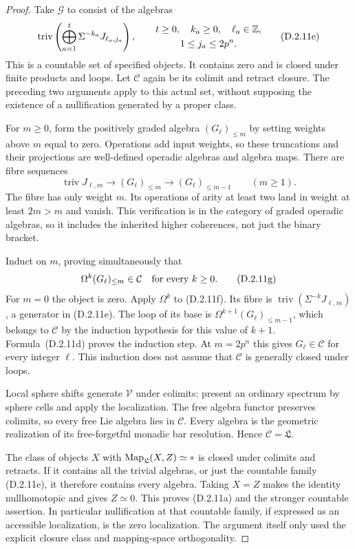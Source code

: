\begin{proof}
Take $\mathcal G$ to consist of the algebras
\[
 \operatorname{triv}
 \left(\bigoplus_{a=1}^t
       \Sigma^{-k_a}J_{\ell_a,j_a}\right),
 \qquad
 \begin{gathered}
 t\geq0,\quad k_a\geq0,\quad \ell_a\in\mathbb Z,\\
 1\leq j_a\leq2p^n.
 \end{gathered}
 \tag{D.2.11e}
\]
This is a countable set of specified objects. It contains zero
and is closed under finite products and loops. Let $\mathcal C$
again be its colimit and retract closure. The preceding two
arguments apply to this actual set, without supposing the
existence of a nullification generated by a proper class.

For $m\geq0$, form the positively graded algebra
$(G_\ell)_{\leq m}$ by setting weights above $m$ equal to zero.
Operations add input weights, so these truncations and their
projections are well-defined operadic algebras and algebra maps.
There are fibre sequences
\[
 \operatorname{triv}J_{\ell,m}\longrightarrow
 (G_\ell)_{\leq m}\longrightarrow(G_\ell)_{\leq m-1}
 \qquad(m\geq1).
 \tag{D.2.11f}
\]
The fibre has only weight $m$. Its operations of arity at least
two land in weight at least $2m>m$ and vanish. This verification
is in the category of graded operadic algebras, so it includes
the inherited higher coherences, not just the binary bracket.

Induct on $m$, proving simultaneously that
\[
 \Omega^k(G_\ell)_{\leq m}\in\mathcal C
                   \quad\hbox{for every }k\geq0.
 \tag{D.2.11g}
\]
For $m=0$ the object is zero. Apply $\Omega^k$ to
\textup{(D.2.11f)}. Its fibre is
$\operatorname{triv}(\Sigma^{-k}J_{\ell,m})$, a generator in
\textup{(D.2.11e)}. The loop of its base is
$\Omega^{k+1}(G_\ell)_{\leq m-1}$, which belongs to
$\mathcal C$ by the induction hypothesis for this value of
$k+1$. Formula~\textup{(D.2.11d)} proves the induction step.
At $m=2p^n$ this gives $G_\ell\in\mathcal C$ for every
integer $\ell$. This induction does not assume that
$\mathcal C$ is generally closed under loops.

Local sphere shifts generate $\mathcal V$ under colimits:
present an ordinary spectrum by sphere cells and apply the
localization. The free algebra functor preserves colimits, so
every free Lie algebra lies in $\mathcal C$. Every algebra is
the geometric realization of its free-forgetful monadic bar
resolution. Hence $\mathcal C=\mathfrak L$.

The class of objects $X$ with $\operatorname{Map}_{\mathfrak L}(X,Z)\simeq *$
is closed under colimits and retracts. If it contains all the
trivial algebras, or just the countable family
\textup{(D.2.11e)}, it therefore contains every algebra. Taking
$X=Z$ makes the identity nullhomotopic and gives $Z\simeq0$.
This proves \textup{(D.2.11a)} and the stronger countable
assertion. In particular nullification at that countable family,
if expressed as an accessible localization, is the zero
localization. The argument itself only used the explicit
closure class and mapping-space orthogonality.


\end{proof}
